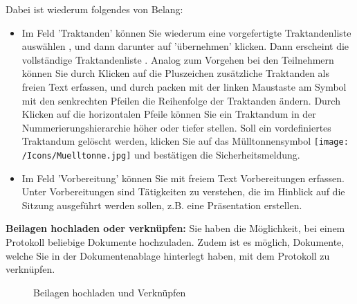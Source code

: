 Dabei ist wiederum folgendes von Belang:

\begin{itemize}
\item 
Im Feld 'Traktanden' können Sie wiederum eine vorgefertigte Traktandenliste auswählen , und dann darunter auf 'übernehmen'  klicken. Dann erscheint die vollständige Traktandenliste . Analog zum Vorgehen bei den Teilnehmern können Sie durch Klicken auf die Pluszeichen  zusätzliche Traktanden als freien Text erfassen, und durch packen mit der linken Maustaste am Symbol mit den senkrechten Pfeilen  die Reihenfolge der Traktanden ändern. Durch Klicken auf die horizontalen Pfeile  können Sie ein Traktandum in der Nummerierungshierarchie höher oder tiefer stellen. Soll ein vordefiniertes Traktandum gelöscht werden, klicken Sie auf das Mülltonnensymbol \texttt{[image: /Icons/Muelltonne.jpg]}  und bestätigen die Sicherheitsmeldung.
\item 
Im Feld 'Vorbereitung' können Sie mit freiem Text Vorbereitungen  erfassen. Unter Vorbereitungen sind Tätigkeiten zu verstehen, die im Hinblick auf die Sitzung ausgeführt werden sollen, z.B. eine Präsentation erstellen.
\end{itemize}

\textbf{Beilagen hochladen oder verknüpfen:}
Sie haben die Möglichkeit, bei einem Protokoll beliebige Dokumente hochzuladen. Zudem ist es möglich, Dokumente, welche Sie in der Dokumentenablage hinterlegt haben, mit dem Protokoll zu verknüpfen.  

\vspace{\baselineskip}

\begin{figure}[H]
\caption{Beilagen hochladen und Verknüpfen}
\end{figure}

\vspace{\baselineskip}

